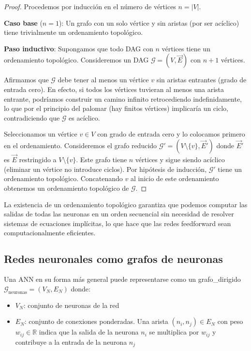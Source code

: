 \begin{proof}
Procedemos por inducción en el número de vértices $n = |V|$.

\textbf{Caso base} ($n = 1$): Un grafo con un solo vértice y sin aristas (por ser acíclico) tiene trivialmente un ordenamiento topológico.

\textbf{Paso inductivo}: Supongamos que todo \gls{DAG} con $n$ vértices tiene un ordenamiento topológico. Consideremos un \gls{DAG} $\mathcal{G} = (V, \vec{E})$ con $n+1$ vértices.

Afirmamos que $\mathcal{G}$ debe tener al menos un vértice $v$ sin aristas entrantes (grado de entrada cero). En efecto, si todos los vértices tuvieran al menos una arista entrante, podríamos construir un camino infinito retrocediendo indefinidamente, lo que por el principio del palomar (hay finitos vértices) implicaría un ciclo, contradiciendo que $\mathcal{G}$ es acíclico.

Seleccionamos un vértice $v \in V$ con grado de entrada cero y lo colocamos primero en el ordenamiento. Consideremos el grafo reducido $\mathcal{G}' = (V \setminus \{v\}, \vec{E}')$ donde $\vec{E}'$ es $\vec{E}$ restringido a $V \setminus \{v\}$. Este grafo tiene $n$ vértices y sigue siendo acíclico (eliminar un vértice no introduce ciclos). Por hipótesis de inducción, $\mathcal{G}'$ tiene un ordenamiento topológico. Concatenando $v$ al inicio de este ordenamiento obtenemos un ordenamiento topológico de $\mathcal{G}$.
\end{proof}

La existencia de un ordenamiento topológico garantiza que podemos computar las salidas de todas las neuronas en un orden secuencial sin necesidad de resolver sistemas de ecuaciones implícitas, lo que hace que las redes feedforward sean computacionalmente eficientes.

\subsection{Redes neuronales como grafos de neuronas}

Una \gls{ANN} en su forma más general puede representarse como un \gls{grafo_dirigido} $\mathcal{G}_{\text{neuronas}} = (V_N, E_N)$ donde:
\begin{itemize}
    \item $V_N$: conjunto de neuronas de la red
    \item $E_N$: conjunto de conexiones ponderadas. Una arista $(n_i, n_j) \in E_N$ con peso $w_{ij} \in \mathbb{R}$ indica que la salida de la neurona $n_i$ se multiplica por $w_{ij}$ y contribuye a la entrada de la neurona $n_j$
\end{itemize}

